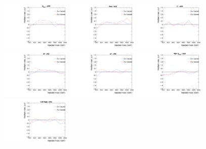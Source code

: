 \begin{figure}[htbp]
  \centering
  \includegraphics[width=0.3\textwidth]{fig/fitValidation/bias_GbuToWW_median.pdf}
  \includegraphics[width=0.3\textwidth]{fig/fitValidation/bias_RadToWW_median.pdf}
  \includegraphics[width=0.3\textwidth]{fig/fitValidation/bias_ZprToWW_median.pdf}\\
  \includegraphics[width=0.3\textwidth]{fig/fitValidation/bias_WprToWZ_median.pdf}
  \includegraphics[width=0.3\textwidth]{fig/fitValidation/bias_WprToWH_median.pdf}
  \includegraphics[width=0.3\textwidth]{fig/fitValidation/bias_VBFGbuToWW_median.pdf}\\
  \includegraphics[width=0.3\textwidth]{fig/fitValidation/bias_VBFRadToWW_median.pdf}

\end{figure}
